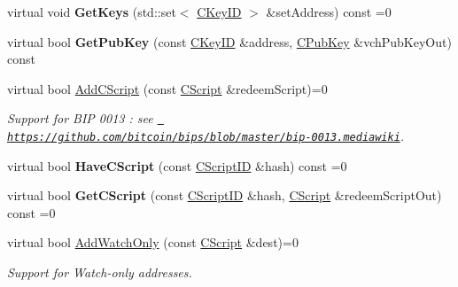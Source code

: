 \begin{DoxyCompactItemize}
\item 
\mbox{\label{class_c_key_store_aca5044014720308f191113e7ba297d13}} 
virtual void {\bfseries Get\+Keys} (std\+::set$<$ \mbox{\hyperlink{class_c_key_i_d}{C\+Key\+ID}} $>$ \&set\+Address) const =0
\item 
\mbox{\label{class_c_key_store_ab83687ea4c9df138b21f6ec3e9809f42}} 
virtual bool {\bfseries Get\+Pub\+Key} (const \mbox{\hyperlink{class_c_key_i_d}{C\+Key\+ID}} \&address, \mbox{\hyperlink{class_c_pub_key}{C\+Pub\+Key}} \&vch\+Pub\+Key\+Out) const
\item 
\mbox{\label{class_c_key_store_a2fb2e02e8cdc364607efd5ebb14b8064}} 
virtual bool \mbox{\hyperlink{class_c_key_store_a2fb2e02e8cdc364607efd5ebb14b8064}{Add\+C\+Script}} (const \mbox{\hyperlink{class_c_script}{C\+Script}} \&redeem\+Script)=0
\begin{DoxyCompactList}\small\item\em Support for B\+IP 0013 \+: see \href{https://github.com/bitcoin/bips/blob/master/bip-0013.mediawiki}{\texttt{ https\+://github.\+com/bitcoin/bips/blob/master/bip-\/0013.\+mediawiki}}. \end{DoxyCompactList}\item 
\mbox{\label{class_c_key_store_a51c9fc86b2c3fece10d86146231fa58d}} 
virtual bool {\bfseries Have\+C\+Script} (const \mbox{\hyperlink{class_c_script_i_d}{C\+Script\+ID}} \&hash) const =0
\item 
\mbox{\label{class_c_key_store_ae6bf4dbeb0705e199250e48aa5d34264}} 
virtual bool {\bfseries Get\+C\+Script} (const \mbox{\hyperlink{class_c_script_i_d}{C\+Script\+ID}} \&hash, \mbox{\hyperlink{class_c_script}{C\+Script}} \&redeem\+Script\+Out) const =0
\item 
\mbox{\label{class_c_key_store_a12cd4eaa01bd4f4231c0bf68425a44af}} 
virtual bool \mbox{\hyperlink{class_c_key_store_a12cd4eaa01bd4f4231c0bf68425a44af}{Add\+Watch\+Only}} (const \mbox{\hyperlink{class_c_script}{C\+Script}} \&dest)=0
\begin{DoxyCompactList}\small\item\em Support for Watch-\/only addresses. \end{DoxyCompactList}\item 

\end{DoxyCompactItemize}
